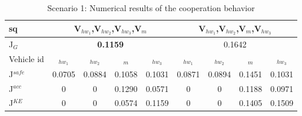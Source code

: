 \begin{table}[!h]
\setlength\tabcolsep{6pt} %


\caption{Scenario 1: Numerical results of the cooperation behavior }
\label{Tab: Summary_scenario_01}
\begin{tabular}{|l|ccccl|ccccl|}
\hline
sq                 & \multicolumn{5}{c|}{V$_{hw_1}$,V$_{hw_2}$,V$_{hw_3}$,V$_{m}$}                                                                          & \multicolumn{5}{c|}{V$_{hw_1}$,V$_{hw_2}$,V$_{m}$,V$_{hw_3}$}                                                                          \\ \hline
J$_{G} $           & \multicolumn{5}{c|}{\textbf{0.1159}}                                                                                  & \multicolumn{5}{c|}{0.1642}                                                                                           \\ \hline
Vehicle id                & \multicolumn{1}{c|}{$_{hw_1}$}     & \multicolumn{1}{c|}{$_{hw_2}$}     & \multicolumn{1}{c|}{$_{m}$}     & \multicolumn{2}{c|}{$_{hw_3}$}     & \multicolumn{1}{c|}{$_{hw_1}$}     & \multicolumn{1}{c|}{$_{hw_2}$}     & \multicolumn{1}{c|}{$_{m}$}     & \multicolumn{2}{c|}{$_{hw_3}$}     \\ \hline
J$^{safe}$       & \multicolumn{1}{c|}{0.0705} & \multicolumn{1}{c|}{0.0884} & \multicolumn{1}{c|}{0.1058} & \multicolumn{2}{c|}{0.1031} & \multicolumn{1}{c|}{0.0871} & \multicolumn{1}{c|}{0.0894} & \multicolumn{1}{c|}{0.1451} & \multicolumn{2}{c|}{0.1031} \\ \hline
J$^{acc}$ & \multicolumn{1}{c|}{0}      & \multicolumn{1}{c|}{0}      & \multicolumn{1}{c|}{0.1290} & \multicolumn{2}{c|}{0.0571} & \multicolumn{1}{c|}{0}      & \multicolumn{1}{c|}{0}      & \multicolumn{1}{c|}{0.1188} & \multicolumn{2}{c|}{0.0971} \\ \hline
J$^{KE} $      & \multicolumn{1}{c|}{0}      & \multicolumn{1}{c|}{0}      & \multicolumn{1}{c|}{0.0574} & \multicolumn{2}{c|}{0.1159} & \multicolumn{1}{c|}{0}      & \multicolumn{1}{c|}{0}      & \multicolumn{1}{c|}{0.1405} & \multicolumn{2}{c|}{0.1509} \\ \hline
\end{tabular}
\vspace{-3mm}
\end{table}



